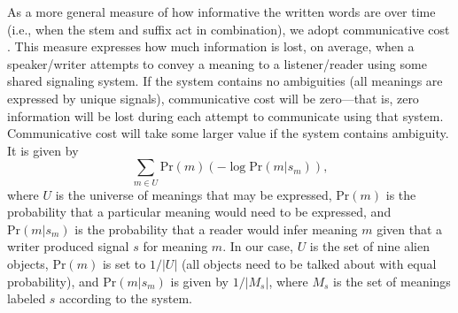 \documentclass[doc,biblatex]{apa7}
\begin{document}
As a more general measure of how informative the written words are over time (i.e., when the stem and suffix act in combination), we adopt communicative cost \parencite{KempRegier:2012, Regier:2015, Kemp:2018}. This measure expresses how much information is lost, on average, when a speaker/writer attempts to convey a meaning to a listener/reader using some shared signaling system. If the system contains no ambiguities (all meanings are expressed by unique signals), communicative cost will be zero---that is, zero information will be lost during each attempt to communicate using that system. Communicative cost will take some larger value if the system contains ambiguity. It is given by
	\begin{equation}
	\sum_{m \in U} \mathrm{Pr}(m) ( -\log \mathrm{Pr}(m|s_m) ),
	\end{equation}
where $U$ is the universe of meanings that may be expressed, $\mathrm{Pr}(m)$ is the probability that a particular meaning would need to be expressed, and $\mathrm{Pr}(m|s_m)$ is the probability that a reader would infer meaning $m$ given that a writer produced signal $s$ for meaning $m$. In our case, $U$ is the set of nine alien objects, $\mathrm{Pr}(m)$ is set to $1/|U|$ (all objects need to be talked about with equal probability), and $\mathrm{Pr}(m|s_m)$ is given by $1/|M_s|$, where $M_s$ is the set of meanings labeled $s$ according to the system.
\end{document}
